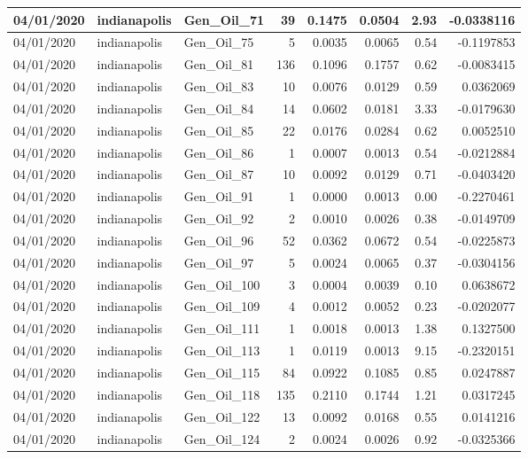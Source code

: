 \documentclass[
  letterpaper,
  DIV=11,
  numbers=noendperiod]{scrartcl}
\begin{document}
\begin{tabular}{l|l|l|r|r|r|r|r}
\hline
04/01/2020 & indianapolis & Gen\_Oil\_71 & 39 & 0.1475 & 0.0504 & 2.93 & -0.0338116\\
\hline
04/01/2020 & indianapolis & Gen\_Oil\_75 & 5 & 0.0035 & 0.0065 & 0.54 & -0.1197853\\
\hline
04/01/2020 & indianapolis & Gen\_Oil\_81 & 136 & 0.1096 & 0.1757 & 0.62 & -0.0083415\\
\hline
04/01/2020 & indianapolis & Gen\_Oil\_83 & 10 & 0.0076 & 0.0129 & 0.59 & 0.0362069\\
\hline
04/01/2020 & indianapolis & Gen\_Oil\_84 & 14 & 0.0602 & 0.0181 & 3.33 & -0.0179630\\
\hline
04/01/2020 & indianapolis & Gen\_Oil\_85 & 22 & 0.0176 & 0.0284 & 0.62 & 0.0052510\\
\hline
04/01/2020 & indianapolis & Gen\_Oil\_86 & 1 & 0.0007 & 0.0013 & 0.54 & -0.0212884\\
\hline
04/01/2020 & indianapolis & Gen\_Oil\_87 & 10 & 0.0092 & 0.0129 & 0.71 & -0.0403420\\
\hline
04/01/2020 & indianapolis & Gen\_Oil\_91 & 1 & 0.0000 & 0.0013 & 0.00 & -0.2270461\\
\hline
04/01/2020 & indianapolis & Gen\_Oil\_92 & 2 & 0.0010 & 0.0026 & 0.38 & -0.0149709\\
\hline
04/01/2020 & indianapolis & Gen\_Oil\_96 & 52 & 0.0362 & 0.0672 & 0.54 & -0.0225873\\
\hline
04/01/2020 & indianapolis & Gen\_Oil\_97 & 5 & 0.0024 & 0.0065 & 0.37 & -0.0304156\\
\hline
04/01/2020 & indianapolis & Gen\_Oil\_100 & 3 & 0.0004 & 0.0039 & 0.10 & 0.0638672\\
\hline
04/01/2020 & indianapolis & Gen\_Oil\_109 & 4 & 0.0012 & 0.0052 & 0.23 & -0.0202077\\
\hline
04/01/2020 & indianapolis & Gen\_Oil\_111 & 1 & 0.0018 & 0.0013 & 1.38 & 0.1327500\\
\hline
04/01/2020 & indianapolis & Gen\_Oil\_113 & 1 & 0.0119 & 0.0013 & 9.15 & -0.2320151\\
\hline
04/01/2020 & indianapolis & Gen\_Oil\_115 & 84 & 0.0922 & 0.1085 & 0.85 & 0.0247887\\
\hline
04/01/2020 & indianapolis & Gen\_Oil\_118 & 135 & 0.2110 & 0.1744 & 1.21 & 0.0317245\\
\hline
04/01/2020 & indianapolis & Gen\_Oil\_122 & 13 & 0.0092 & 0.0168 & 0.55 & 0.0141216\\
\hline
04/01/2020 & indianapolis & Gen\_Oil\_124 & 2 & 0.0024 & 0.0026 & 0.92 & -0.0325366\\

\end{tabular}
\end{document}
